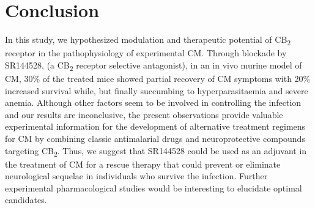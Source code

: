 \documentclass[empirical, authordate]{jote-new-article}
\begin{document}
\section{Conclusion}

In this study, we hypothesized modulation and therapeutic potential of CB\textsubscript{2} receptor in the pathophysiology of experimental CM. Through blockade by SR144528, (a CB\textsubscript{2} receptor selective antagonist), in an in vivo murine model of CM, 30\% of the treated mice showed partial recovery of CM symptoms with 20\% increased survival while, but finally succumbing to hyperparasitaemia and severe anemia. Although other factors seem to be involved in controlling the infection and our results are inconclusive, the present observations provide valuable experimental information for the development of alternative treatment regimens for CM by combining classic antimalarial drugs and neuroprotective compounds targeting CB\textsubscript{2}. Thus, we suggest that SR144528 could be used as an adjuvant in the treatment of CM for a rescue therapy that could prevent or eliminate neurological sequelae in individuals who survive the infection. Further experimental pharmacological studies would be interesting to elucidate optimal candidates.

\nocite{*}
\printbibliography





\end{document}
